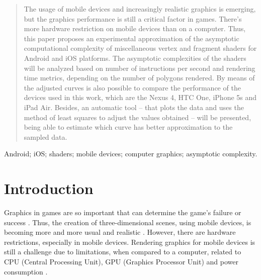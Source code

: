 \documentclass[10pt, conference, compsocconf]{IEEEtran}
\begin{document}
\begin{abstract}
  The usage of mobile devices and increasingly realistic graphics is emerging, but the graphics performance is still a critical factor in games. There's more hardware restriction on mobile devices than on  a computer. Thus, this paper proposes an experimental approximation of the asymptotic computational complexity of miscellaneous vertex and fragment shaders for Android and iOS 
  platforms. The asymptotic complexities of the shaders will be analyzed based on number of instructions per second and rendering 
  time metrics, depending on the number of polygons rendered. By means of the adjusted curves is also possible to compare the performance of the devices used in this work, which are the Nexus 4, HTC One, iPhone 5s and iPad Air. Besides, an automatic tool -- that plots the data and uses the method of least squares to adjust the values obtained -- will be presented, being able to estimate which curve has better approximation to the sampled data.  

\end{abstract}

\begin{IEEEkeywords}
Android; iOS; shaders; mobile devices; computer graphics; asymptotic complexity.

\end{IEEEkeywords}


%
\IEEEpeerreviewmaketitle



\section{Introduction}

Graphics in games are so important that can determine the game's failure or success \cite{graphicsprog}.
Thus, the creation of three-dimensional scenes, using mobile devices, is becoming more and more usual and
realistic \cite{mobileRend}. However, there are hardware
restrictions, especially in mobile devices. Rendering graphics for mobile devices is still a challenge due 
to limitations, when compared to a computer, related to CPU (Central Processing
Unit), GPU (Graphics Processor Unit) and power consumption \cite{teapot}.  
\end{document}
